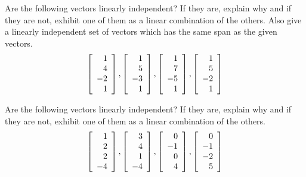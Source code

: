 \begin{enumialphparenastyle}
\begin{ex} Are the following vectors linearly independent? If they are, explain
why and if they are not, exhibit one of them as a linear combination of the
others. Also give a linearly independent set of vectors which has the same
span as the given vectors.
\begin{equation*}
\left[ 
\begin{array}{r}
1 \\ 
4 \\ 
-2 \\ 
1
\end{array}
\right] ,\left[ 
\begin{array}{r}
1 \\ 
5 \\ 
-3 \\ 
1
\end{array}
\right] ,\left[ 
\begin{array}{r}
1 \\ 
7 \\ 
-5 \\ 
1
\end{array}
\right] ,\left[ 
\begin{array}{r}
1 \\ 
5 \\ 
-2 \\ 
1
\end{array}
\right]
\end{equation*}
\end{ex}

\begin{ex} Are the following vectors linearly independent? If they are, explain
why and if they are not, exhibit one of them as a linear combination of the
others. 
\begin{equation*}
\left[ 
\begin{array}{r}
1 \\ 
2 \\ 
2 \\ 
-4
\end{array}
\right] ,\left[ 
\begin{array}{r}
3 \\ 
4 \\ 
1 \\ 
-4
\end{array}
\right] ,\left[ 
\begin{array}{r}
0 \\ 
-1 \\ 
0 \\ 
4
\end{array}
\right] ,\left[ 
\begin{array}{r}
0 \\ 
-1 \\ 
-2 \\ 
5
\end{array}
\right]
\end{equation*}
\end{ex}


\end{enumialphparenastyle}
